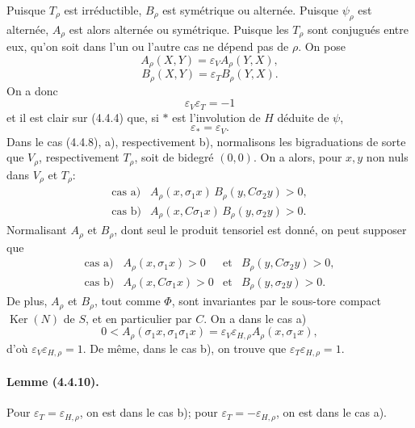\documentclass[10pt]{article}
\newcommand{\Ker}{\operatorname{Ker}}
\begin{document}
Puisque $T_\rho$ est irréductible, $B_\rho$ est symétrique ou alternée. Puisque $\psi_\rho$ est alternée, $A_\rho$ est alors alternée ou symétrique. Puisque les $T_\rho$ sont conjugués entre eux, qu'on soit dans l'un ou l'autre cas ne dépend pas de $\rho$. On pose
\[
\tag{4.4.9.4}
A_\rho(X,Y)=\varepsilon_V A_\rho(Y,X),
\]
\[
\tag{4.4.9.5}
B_\rho(X,Y)=\varepsilon_T B_\rho(Y,X).
\]
On a donc
\[
\tag{4.4.9.6}
\varepsilon_V\varepsilon_T=-1
\]
et il est clair sur (4.4.4) que, si $*$ est l'involution de $H$ déduite de $\psi$,
\[
\tag{4.4.9.7}
\varepsilon_*=\varepsilon_V.
\]
Dans le cas (4.4.8), a), respectivement b), normalisons les bigraduations de sorte que $V_\rho$, respectivement $T_\rho$, soit de bidegré $(0,0)$. On a alors, pour $x,y$ non nuls dans $V_\rho$ et $T_\rho$:
\[
\begin{array}{ll}
\text{cas a)}& A_\rho(x,\sigma_1x)\,B_\rho(y,C\sigma_2y)>0,\\[0.3em]
\text{cas b)}& A_\rho(x,C\sigma_1x)\,B_\rho(y,\sigma_2y)>0.
\end{array}
\]
Normalisant $A_\rho$ et $B_\rho$, dont seul le produit tensoriel est donné, on peut supposer que
\[
\begin{array}{llll}
\text{cas a)}& A_\rho(x,\sigma_1x)>0 & \text{et} & B_\rho(y,C\sigma_2y)>0,\\[0.3em]
\text{cas b)}& A_\rho(x,C\sigma_1x)>0 & \text{et} & B_\rho(y,\sigma_2y)>0.
\end{array}
\]
De plus, $A_\rho$ et $B_\rho$, tout comme $\Phi$, sont invariantes par le sous-tore compact $\Ker(N)$ de $S$, et en particulier par $C$. On a dans le cas a)
\[
0<A_\rho(\sigma_1x,\sigma_1\sigma_1x)
=\varepsilon_V\varepsilon_{H,\rho}A_\rho(x,\sigma_1x),
\]
d'où $\varepsilon_V\varepsilon_{H,\rho}=1$. De même, dans le cas b), on trouve que $\varepsilon_T\varepsilon_{H,\rho}=1$.

\paragraph{Lemme (4.4.10).} Pour $\varepsilon_T=\varepsilon_{H,\rho}$, on est dans le cas b); pour $\varepsilon_T=-\varepsilon_{H,\rho}$, on est dans le cas a).
\end{document}
